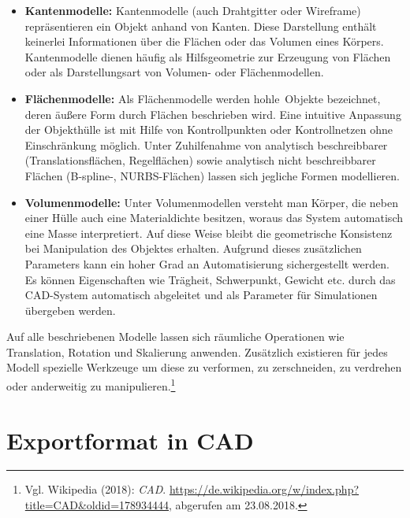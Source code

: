 \begin{itemize}
\item \textbf{Kantenmodelle:} Kantenmodelle (auch Drahtgitter oder Wireframe) repräsentieren ein Objekt anhand von Kanten. Diese Darstellung enthält keinerlei Informationen über die Flächen oder das Volumen eines Körpers. Kantenmodelle dienen häufig als Hilfsgeometrie zur Erzeugung von Flächen oder als Darstellungsart von Volumen- oder Flächenmodellen.

\item \textbf{Flächenmodelle:} Als Flächenmodelle werden \glqq hohle\grqq\ Objekte bezeichnet, deren äußere Form durch Flächen beschrieben wird. Eine intuitive Anpassung der Objekthülle ist mit Hilfe von Kontrollpunkten oder Kontrollnetzen ohne Einschränkung möglich. Unter Zuhilfenahme von analytisch beschreibbarer (Translationsflächen, Regelflächen) sowie analytisch nicht beschreibbarer Flächen (B-spline-, NURBS-Flächen) lassen sich jegliche Formen modellieren.

\item \textbf{Volumenmodelle:} Unter Volumenmodellen versteht man Körper, die neben einer Hülle auch eine Materialdichte besitzen, woraus das System automatisch eine Masse interpretiert. Auf diese Weise bleibt die geometrische Konsistenz bei Manipulation des Objektes erhalten. Aufgrund dieses zusätzlichen Parameters kann ein hoher Grad an Automatisierung sichergestellt werden. Es können Eigenschaften wie Trägheit, Schwerpunkt, Gewicht etc. durch das CAD-System automatisch abgeleitet und als Parameter für Simulationen übergeben werden.  
\end{itemize}

Auf alle beschriebenen Modelle lassen sich räumliche Operationen wie Translation, Rotation und Skalierung anwenden. Zusätzlich existieren für jedes Modell spezielle Werkzeuge um diese zu verformen, zu zerschneiden, zu verdrehen oder anderweitig zu manipulieren.\footnote{Vgl. Wikipedia  (2018): \textit{CAD}.\newline
\url{https://de.wikipedia.org/w/index.php?title=CAD&oldid=178934444},\newline 
abgerufen am 23.08.2018.} 

\section{Exportformat in CAD}
\label{sec:ExportformatInCAD}

